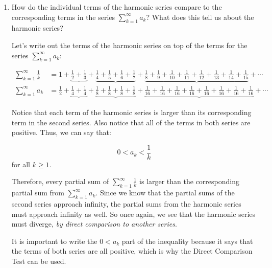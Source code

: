 \documentclass[main]{subfiles}
\begin{document}
\begin{enumerate}
\begin{enumerate}
      \item
      \begin{problem}
      How do the individual terms of the harmonic series compare to the corresponding terms in the series $\displaystyle \sum_{k=1}^{\infty} a_k$? What does this tell us about the harmonic series?
      \end{problem}

      \begin{solution}
      Let's write out the terms of the harmonic series on top of the terms for the series $\displaystyle \sum_{k=1}^{\infty} a_k$:
      
      \begin{align*}
      \displaystyle \sum_{k=1}^{\infty} \frac1k &= 1+\underbrace{\frac12 +\frac13} +\underbrace{\frac14 +\frac15 +\frac16 +\frac{1}{7}}+\underbrace{\frac{1}{8}+\frac{1}{9}+\frac{1}{10}+\frac{1}{11}+\frac{1}{12}+\frac{1}{13}+\frac{1}{14}+\frac{1}{15}}+ \cdots\\
      \displaystyle \sum_{k=1}^{\infty} a_k &= \frac{1}{2} + \underbrace{\frac{1}{4} +
      \frac{1}{4}} + \underbrace{\frac{1}{8} + \frac{1}{8}+\frac{1}{8}+
      \frac{1}{8}} + \underbrace{\frac{1}{16} + \frac{1}{16}+\frac{1}{16} + \frac{1}{16} + \frac{1}{16} + \frac{1}{16} + \frac{1}{16} + \frac{1}{16}} + \cdots
      \end{align*}
      
      Notice that each term of the harmonic series is larger than its corresponding term in the second series. Also notice that all of the terms in both series are positive. Thus, we can say that:
      
      $$0<a_k< \frac{1}{k}$$
      for all $k\geq 1$. 
      
      Therefore, every partial sum of $\displaystyle \sum_{k=1}^{\infty} \frac1k$ is larger than the corresponding partial sum from $\displaystyle \sum_{k=1}^{\infty} a_k$. Since we know that the partial sums of the second series approach infinity, the partial sums from the harmonic series must approach infinity as well. So once again, we see that the harmonic series must diverge, \textit{by direct comparison to another series}.
      
      It is important
      to write the $0 < a_k$ part of the inequality because it says that
      the terms of both series are all positive, which is why the
      Direct Comparison Test can be used.
      \end{solution}

    \end{enumerate}


\end{enumerate}
\end{document}
